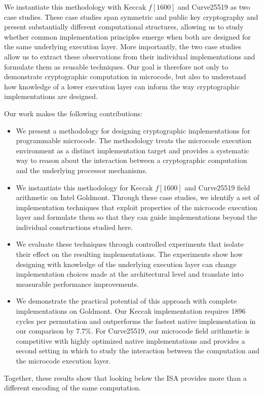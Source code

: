 \documentclass[journal=tches,submission]{iacrtrans}
\newcommand{\sabrina}[1]{\todo[color=pink,size=\footnotesize]{\textcolor{black}{\textbf{Sabrina:} #1}}}
\begin{document}
We instantiate this methodology with Keccak $f[1600]$ and Curve25519 as two case studies.
These case studies span symmetric and public key cryptography and present substantially different computational structures, allowing us to study whether common implementation principles emerge when both are designed for the same underlying execution layer. 
More importantly, the two case studies allow us to extract these observations from their individual implementations and formulate them as reusable techniques. 
Our goal is therefore not only to demonstrate cryptographic computation in microcode, but also to understand how knowledge of a lower execution layer can inform the way cryptographic implementations are designed. 

Our work makes the following contributions:

\begin{itemize}[itemsep=1pt, parsep=0pt, topsep=1pt, partopsep=0pt] 
  
  \item We present a methodology for designing cryptographic implementations for programmable microcode. 
  The methodology treats the microcode execution environment as a distinct implementation target and provides a systematic way to reason about the interaction between a cryptographic computation and the underlying processor mechanisms. 
  
  \item We instantiate this methodology for Keccak $f[1600]$ and Curve25519 field arithmetic on Intel Goldmont. 
  Through these case studies, we identify a set of implementation techniques that exploit properties of the microcode execution layer and formulate them so that they can guide implementations beyond the individual constructions studied here. 
  
  \item We evaluate these techniques through controlled experiments that isolate their effect on the resulting implementations. 
  The experiments show how designing with knowledge of the underlying execution layer can change implementation choices made at the architectural level and translate into measurable performance improvements. 
  
  \item We demonstrate the practical potential of this approach with complete implementations on Goldmont. 
  Our Keccak implementation requires 1896 cycles per permutation and outperforms the fastest native implementation in our comparison by 7.7\%. 
  For Curve25519, our microcode field arithmetic is competitive with highly optimized native implementations and provides a second setting in which to study the interaction between the computation and the microcode execution layer. 
\sabrina{Curve25519 number to be added here}
\end{itemize} Together, these results show that looking below the ISA provides more than a different encoding of the same computation. 
\end{document}
